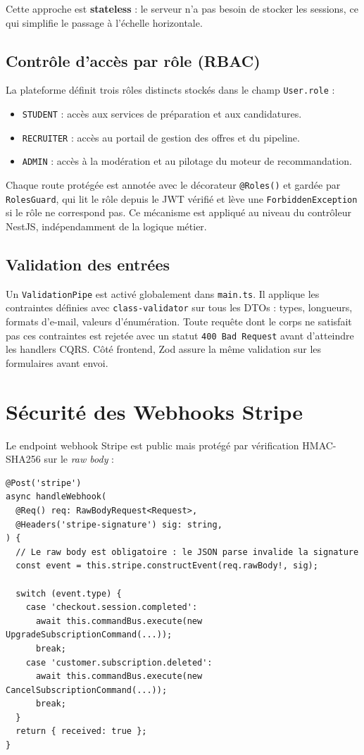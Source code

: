 ﻿\documentclass[12pt,a4paper]{report}
\begin{document}
Cette approche est \textbf{stateless} : le serveur n'a pas besoin de stocker les sessions, ce qui simplifie le passage à l'échelle horizontale.

\subsection{Contrôle d'accès par rôle (RBAC)}

La plateforme définit trois rôles distincts stockés dans le champ \texttt{User.role} :

\begin{itemize}
  \item \texttt{STUDENT} : accès aux services de préparation et aux candidatures.
  \item \texttt{RECRUITER} : accès au portail de gestion des offres et du pipeline.
  \item \texttt{ADMIN} : accès à la modération et au pilotage du moteur de recommandation.
\end{itemize}

Chaque route protégée est annotée avec le décorateur \texttt{@Roles()} et gardée par \texttt{RolesGuard}, qui lit le rôle depuis le JWT vérifié et lève une \texttt{ForbiddenException} si le rôle ne correspond pas. Ce mécanisme est appliqué au niveau du contrôleur NestJS, indépendamment de la logique métier.

\subsection{Validation des entrées}

Un \texttt{ValidationPipe} est activé globalement dans \texttt{main.ts}. Il applique les contraintes définies avec \texttt{class-validator} sur tous les DTOs : types, longueurs, formats d'e-mail, valeurs d'énumération. Toute requête dont le corps ne satisfait pas ces contraintes est rejetée avec un statut \texttt{400 Bad Request} avant d'atteindre les handlers CQRS. Côté frontend, Zod assure la même validation sur les formulaires avant envoi.

\section{Sécurité des Webhooks Stripe}

Le endpoint webhook Stripe est public mais protégé par vérification HMAC-SHA256 sur le \textit{raw body} :

\begin{lstlisting}[style=ts, caption={Vérification HMAC-SHA256 du webhook Stripe}]
@Post('stripe')
async handleWebhook(
  @Req() req: RawBodyRequest<Request>,
  @Headers('stripe-signature') sig: string,
) {
  // Le raw body est obligatoire : le JSON parse invalide la signature
  const event = this.stripe.constructEvent(req.rawBody!, sig);

  switch (event.type) {
    case 'checkout.session.completed':
      await this.commandBus.execute(new UpgradeSubscriptionCommand(...));
      break;
    case 'customer.subscription.deleted':
      await this.commandBus.execute(new CancelSubscriptionCommand(...));
      break;
  }
  return { received: true };
}
\end{lstlisting}
\end{document}
